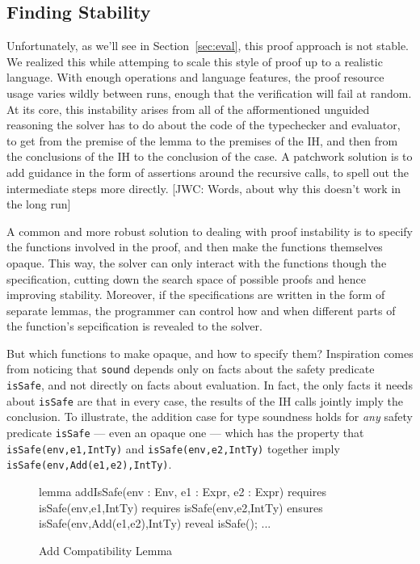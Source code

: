 \documentclass[sigplan,review,screen,anonymous]{acmart}
\newcommand{\comm}[3]{\textcolor{#1}{[#2: #3]}}
\newcommand{\jwc}[1]{\comm{dkgreen}{JWC}{#1}}
\begin{document}
\subsection*{Finding Stability}
Unfortunately, as we'll see in Section~\ref{sec:eval}, this proof approach is
not stable. We realized this while attemping to scale this style
of proof up to a realistic language. With enough operations and language
features, the proof resource usage varies wildly between runs,
enough that the verification will fail at random. At its core, this
instability arises from all of the afformentioned unguided reasoning the solver has to do about the
code of the typechecker and evaluator,
to get from the premise of the lemma to the premises of the IH, and then
from the conclusions of the IH to the conclusion of the case.
A patchwork solution is to add guidance in the form of assertions around the
recursive calls, to spell out the intermediate steps more directly.
\jwc{Words, about why this doesn't work in the long run}

A common and more robust solution to dealing with proof instability is to specify
the functions involved in the proof, and then make the functions themselves opaque.
This way, the solver can only interact with the functions though the specification,
cutting down the search space of possible proofs and hence improving stability.
Moreover, if the specifications are written in the form of separate lemmas,
the programmer can control how and when different parts of the function's sepcification
is revealed to the solver.

But which functions to make opaque, and how to specify them?
Inspiration comes from noticing that \texttt{sound} depends only on
facts about the safety predicate \texttt{isSafe}, and not directly
on facts about evaluation. In fact, the only facts it needs about \texttt{isSafe}
are that in every case, the results of the IH calls jointly imply the conclusion.
To illustrate, the addition case for type soundness holds
for \emph{any} safety predicate \texttt{isSafe} --- even an opaque one --- which has the property
that \texttt{isSafe(env,e1,IntTy)} and \texttt{isSafe(env,e2,IntTy)}
together imply \texttt{isSafe(env,Add(e1,e2),IntTy)}.


\begin{figure}
\begin{dafny}
lemma addIsSafe(env : Env, e1 : Expr, e2 : Expr)
  requires isSafe(env,e1,IntTy)
  requires isSafe(env,e2,IntTy)
  ensures isSafe(env,Add(e1,e2),IntTy)
{reveal isSafe(); ...}
\end{dafny}
  \caption{Add Compatibility Lemma}
  \label{fig:add-is-safe}
\end{figure}
\end{document}
